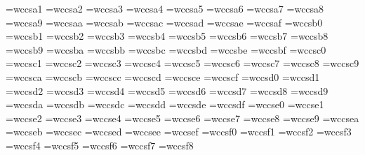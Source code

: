%
\font\cfaB=wccsa1
\font\cfaC=wccsa2
\font\cfaD=wccsa3
\font\cfaE=wccsa4
\font\cfaF=wccsa5
\font\cfaG=wccsa6
\font\cfaH=wccsa7
\font\cfaI=wccsa8
\font\cfaJ=wccsa9
\font\cfaa=wccsaa
\font\cfab=wccsab
\font\cfac=wccsac
\font\cfad=wccsad
\font\cfae=wccsae
\font\cfaf=wccsaf
\font\cfbA=wccsb0
\font\cfbB=wccsb1
\font\cfbC=wccsb2
\font\cfbD=wccsb3
\font\cfbE=wccsb4
\font\cfbF=wccsb5
\font\cfbG=wccsb6
\font\cfbH=wccsb7
\font\cfbI=wccsb8
\font\cfbJ=wccsb9
\font\cfba=wccsba
\font\cfbb=wccsbb
\font\cfbc=wccsbc
\font\cfbd=wccsbd
\font\cfbe=wccsbe
\font\cfbf=wccsbf
\font\cfcA=wccsc0
\font\cfcB=wccsc1
\font\cfcC=wccsc2
\font\cfcD=wccsc3
\font\cfcE=wccsc4
\font\cfcF=wccsc5
\font\cfcG=wccsc6
\font\cfcH=wccsc7
\font\cfcI=wccsc8
\font\cfcJ=wccsc9
\font\cfca=wccsca
\font\cfcb=wccscb
\font\cfcc=wccscc
\font\cfcd=wccscd
\font\cfce=wccsce
\font\cfcf=wccscf
\font\cfdA=wccsd0
\font\cfdB=wccsd1
\font\cfdC=wccsd2
\font\cfdD=wccsd3
\font\cfdE=wccsd4
\font\cfdF=wccsd5
\font\cfdG=wccsd6
\font\cfdH=wccsd7
\font\cfdI=wccsd8
\font\cfdJ=wccsd9
\font\cfda=wccsda
\font\cfdb=wccsdb
\font\cfdc=wccsdc
\font\cfdd=wccsdd
\font\cfde=wccsde
\font\cfdf=wccsdf
\font\cfeA=wccse0
\font\cfeB=wccse1
\font\cfeC=wccse2
\font\cfeD=wccse3
\font\cfeE=wccse4
\font\cfeF=wccse5
\font\cfeG=wccse6
\font\cfeH=wccse7
\font\cfeI=wccse8
\font\cfeJ=wccse9
\font\cfea=wccsea
\font\cfeb=wccseb
\font\cfec=wccsec
\font\cfed=wccsed
\font\cfee=wccsee
\font\cfef=wccsef
\font\cffA=wccsf0
\font\cffB=wccsf1
\font\cffC=wccsf2
\font\cffD=wccsf3
\font\cffE=wccsf4
\font\cffF=wccsf5
\font\cffG=wccsf6
\font\cffH=wccsf7
\font\cffI=wccsf8
%
\newif\ifchifontset
\chifontsetfalse %
%
\newif\ifbigC
\bigCfalse %
\def\cglue{\hskip0pt plus.5pt}
\newcount\Cchar
%
\def\cchar#1{\Cchar=#1\ifbigC\advance\Cchar by -128\fi\char\the\Cchar}
\def\chichar#1#2{\ifchifontset\cchar{#1}\restorefont\discretionary{}{}{}\cglue\chifontsetfalse\else\chifontsettrue\edef\restorefont{\the\font}#2\fi}
\def\chichr#1{\ifchifontset\cchar{#1}\restorefont\chifontsetfalse\else\message{!pmC! character #1 out of context!}\fi}
